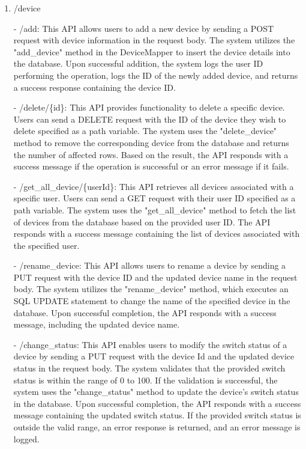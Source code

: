 \begin{enumerate}
    \item /device
    \item[-] /add: This API allows users to add a new device by sending a POST request with device information in the request body. The system utilizes the "add\_device" method in the DeviceMapper to insert the device details into the database. Upon successful addition, the system logs the user ID performing the operation, logs the ID of the newly added device, and returns a success response containing the device ID.\\
    \item[-] /delete/\{id\}: This API provides functionality to delete a specific device. Users can send a DELETE request with the ID of the device they wish to delete specified as a path variable. The system uses the "delete\_device" method to remove the corresponding device from the database and returns the number of affected rows. Based on the result, the API responds with a success message if the operation is successful or an error message if it fails.\\
    \item[-] /get\_all\_device/\{userId\}: This API retrieves all devices associated with a specific user. Users can send a GET request with their user ID specified as a path variable. The system uses the "get\_all\_device" method to fetch the list of devices from the database based on the provided user ID. The API responds with a success message containing the list of devices associated with the specified user.\\
    \item[-] /rename\_device: This API allows users to rename a device by sending a PUT request with the device ID and the updated device name in the request body. The system utilizes the "rename\_device" method, which executes an SQL UPDATE statement to change the name of the specified device in the database. Upon successful completion, the API responds with a success message, including the updated device name.\\
    \item[-] /change\_status: This API enables users to modify the switch status of a device by sending a PUT request with the device Id and the updated device status in the request body. The system validates that the provided switch status is within the range of 0 to 100. If the validation is successful, the system uses the "change\_status" method to update the device's switch status in the database. Upon successful completion, the API responds with a success message containing the updated switch status. If the provided switch status is outside the valid range, an error response is returned, and an error message is logged.\\


\end{enumerate}
